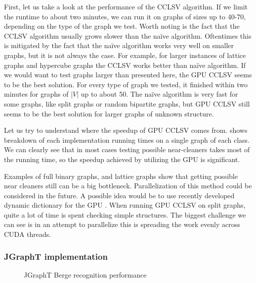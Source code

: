 First, let us take a look at the performance of the CCLSV algorithm. If we limit the runtime to about two minutes, we can run it on graphs of sizes up to 40-70, depending on the type of the graph we test. Worth noting is the fact that the CCLSV algorithm usually grows slower than the na\"ive algorithm. Oftentimes this is mitigated by the fact that the na\"ive algorithm works very well on smaller graphs, but it is not always the case. For example, for larger instances of lattice graphs and hypercube graphs the CCLSV works better than na\"ive algorithm. If we would want to test graphs larger than presented here, the GPU CCLSV seems to be the best solution. For every type of graph we tested, it finished within two minutes for graphs of $|V|$ up to about 50. The na\"ive algorithm is very fast for some graphs, like split graphs or random bipartite graphs, but GPU CCLSV still seems to be the best solution for larger graphs of unknown structure.

Let us try to understand where the speedup of GPU CCLSV comes from.  shows breakdown of each implementation running times on a single graph of each class. We can clearly see that in most cases testing possible near-cleaners takes most of the running time, so the speedup achieved by utilizing the GPU is significant. 

Examples of full binary graphs, and lattice graphs show that getting possible near cleaners still can be a big bottleneck. Parallelization of this method could be considered in the future. A possible idea would be to use recently developed dynamic dictionary for the GPU \cite{Ashkiani2018}. When running GPU CCLSV on split graphs, quite a lot of time is spent checking simple structures. The biggest challenge we can see is in an attempt to parallelize this is spreading the work evenly across CUDA threads.



\subsubsection{JGraphT implementation}

%   
\begin{figure}
  \centering
  
  \caption{JGraphT Berge recognition performance}
  \label{plot:jgrapht}
\end{figure}

